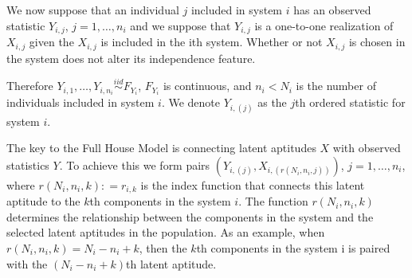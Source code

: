 \documentclass[12pt]{article}
\begin{document}


We now suppose that an individual $j$ included in system $i$ has an observed statistic $Y_{i,j}$, $j = 1,\ldots,n_i$ and we suppose that $Y_{i,j}$ is a one-to-one realization of $X_{i,j}$ given the $X_{i,j}$ is included in the ith system. Whether or not $X_{i,j}$ is chosen in the system does not alter its independence feature.




Therefore $Y_{i,1}, \ldots, Y_{i,n_i} \overset{iid}{\sim} F_{Y_i}$, $F_{Y_i}$ is continuous, and $n_i < N_i$ is the number of individuals included in system $i$. We denote $Y_{i,(j)}$ as the $j$th ordered statistic for system $i$.


The key to the Full House Model is connecting latent aptitudes $X$ with observed statistics $Y$. 
To achieve this we form pairs $(Y_{i,(j)}, X_{i,(r(N_i, n_i, j))})$, 
$j = 1,\ldots,n_i$, where $r(N_i, n_i, k): = r_{i,k}$ is the index function that connects this latent aptitude to the $k$th components in the system $i$. The function $r(N_i, n_i, k)$ determines the relationship between the components in the system and the selected latent aptitudes in the population. As an example, when $r(N_i, n_i, k) = N_i - n_i + k$, then the $k$th components in the system i is paired with the $(N_i - n_i + k)$th latent aptitude. 
\end{document}
